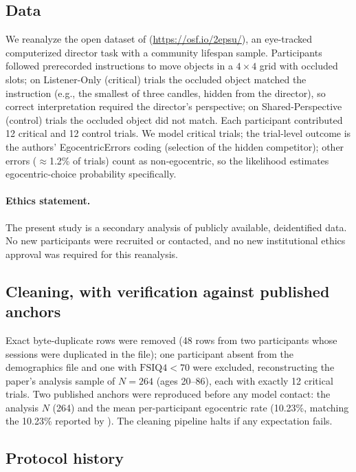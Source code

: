 \documentclass[11pt]{article}
\begin{document}
\subsection{Data}\label{sec:data}

We reanalyze the open dataset of \citet{bradford2023}
(\url{https://osf.io/2epsu/}), an eye-tracked computerized director task with a
community lifespan sample. Participants followed prerecorded instructions to
move objects in a $4 \times 4$ grid with occluded slots; on Listener-Only
(critical) trials the occluded object matched the instruction (e.g., the
smallest of three candles, hidden from the director), so correct interpretation
required the director's perspective; on Shared-Perspective (control) trials the
occluded object did not match. Each participant contributed 12 critical and 12
control trials. We model critical trials; the trial-level outcome is the
authors' EgocentricErrors coding (selection of the hidden competitor); other
errors ($\approx$1.2\% of trials) count as non-egocentric, so the likelihood
estimates egocentric-choice probability specifically.

\paragraph{Ethics statement.}
The present study is a secondary analysis of publicly available,
deidentified data. No new participants were recruited or contacted,
and no new institutional ethics approval was required for this
reanalysis.

\subsection{Cleaning, with verification against published anchors}\label{sec:cleaning}

Exact byte-duplicate rows were removed (48 rows from two participants whose
sessions were duplicated in the file); one participant absent from the
demographics file and one with $\mathrm{FSIQ4} < 70$ were excluded,
reconstructing the paper's analysis sample of $N = 264$ (ages 20--86), each
with exactly 12 critical trials. Two published anchors were reproduced before
any model contact: the analysis $N$ (264) and the mean per-participant
egocentric rate (10.23\%, matching the 10.23\% reported by
\citealp{bradford2023}). The cleaning pipeline halts if any expectation fails.

\subsection{Protocol history}\label{sec:protocol}
\end{document}
